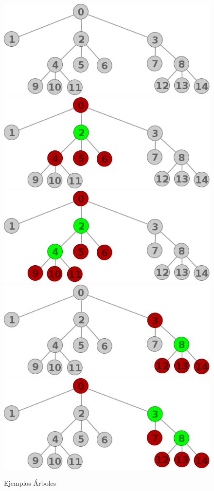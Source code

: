 \begin{figure}[H]
\caption{Ejemplos \'Arboles}
\centering
\includegraphics[scale = 0.5]{img/ej2/tree_st0.png}
\includegraphics[scale = 0.5]{img/ej2/tree_st01.png}
\includegraphics[scale = 0.5]{img/ej2/tree_st02.png}
\includegraphics[scale = 0.5]{img/ej2/tree_st11.png}
\includegraphics[scale = 0.5]{img/ej2/tree_st12.png}
\end{figure}

